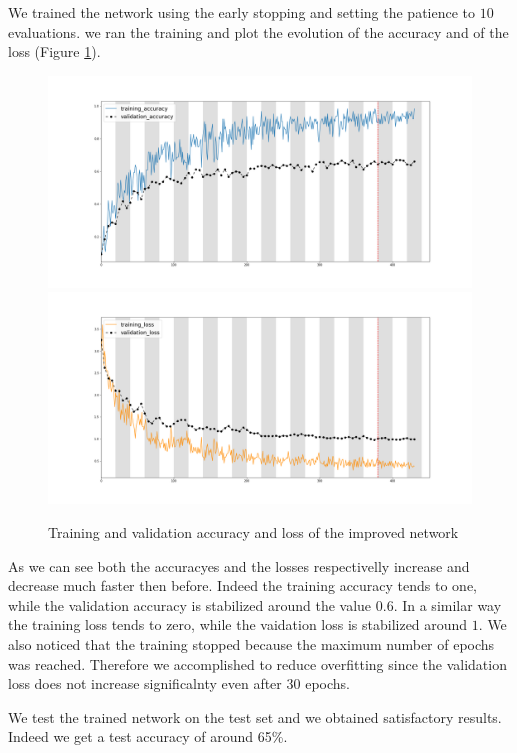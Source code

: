 \documentclass[12pt, a4paper]{report}
\begin{document}
We trained the network using the early stopping and setting the patience to $10$ evaluations. we ran the training and plot the evolution of the accuracy and of the loss (Figure \ref{fig:improved}).

\begin{figure}[h!]
	\centering
	{\includegraphics[width=.49\textwidth]{img/final_accuracy}}
	{\includegraphics[width=.49\textwidth]{img/final_loss}}
	\caption{Training and validation accuracy and loss of the improved network}
	\label{fig:improved}
\end{figure}

As we can see both the accuracyes and the losses respectivelly increase and decrease much faster then before. Indeed the training accuracy tends to one, while the validation accuracy is stabilized around the value $0.6$. In a similar way the training loss tends to zero, while the vaidation loss is stabilized around $1$. We also noticed that the training stopped because the maximum number of epochs was reached. Therefore we accomplished to reduce overfitting since the validation loss does not increase significalnty even after $30$ epochs.

We test the trained network on the test set and we obtained satisfactory results. Indeed we get a test accuracy of around 65\%.
\end{document}
